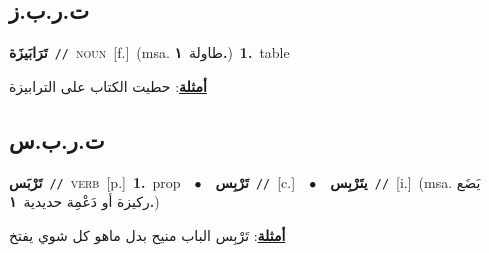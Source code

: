 \documentclass[10pt,a4paper,twoside]{article} %
\begin{document}
\begin{multicols}{2}
\vspace{-3mm}
\subsection*{\color{blue}\foreignlanguage{arabic}{ت.ر.ب.ز}\color{blue}{ (ntws)}} 

{\setlength\topsep{0pt}\textbf{\foreignlanguage{arabic}{تَرَابَيزَة}}\ {\color{gray}\texttt{//}\color{black}}\ \textsc{noun}\ [f.]\ \color{gray}(msa. \foreignlanguage{arabic}{طاولة}~\foreignlanguage{arabic}{\textbf{١.}})\color{black}\ \textbf{1.}~table\  \begin{flushright}\color{gray}\foreignlanguage{arabic}{\textbf{\underline{\foreignlanguage{arabic}{أمثلة}}}: حطيت الكتاب على الترابيزة}\end{flushright}\color{black}} \vspace{2mm}

\vspace{-3mm}
\subsection*{\color{blue}\foreignlanguage{arabic}{ت.ر.ب.س}\color{blue}{ (ntws)}} 

{\setlength\topsep{0pt}\textbf{\foreignlanguage{arabic}{تَرْبَس}}\ {\color{gray}\texttt{//}\color{black}}\ \textsc{verb}\ [p.]\ \textbf{1.}~prop\ \ $\bullet$\ \ \setlength\topsep{0pt}\textbf{\foreignlanguage{arabic}{تَرْبِس}}\ {\color{gray}\texttt{//}\color{black}}\ [c.]\ \ $\bullet$\ \ \setlength\topsep{0pt}\textbf{\foreignlanguage{arabic}{يتَرْبِس}}\ {\color{gray}\texttt{//}\color{black}}\ [i.]\ \color{gray}(msa. \foreignlanguage{arabic}{يَضَع ركيزة أو دَعْمِة حديدية}~\foreignlanguage{arabic}{\textbf{١.}})\color{black}\  \begin{flushright}\color{gray}\foreignlanguage{arabic}{\textbf{\underline{\foreignlanguage{arabic}{أمثلة}}}: تَرْبِس الباب منيح بدل ماهو كل شوي يفتخ}\end{flushright}\color{black}} \vspace{2mm}


\end{multicols}
\end{document}
